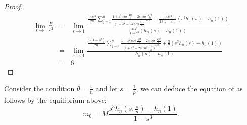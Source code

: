 \documentclass[11pt]{article}
\def\lb{\label}
\begin{document}
\begin{proof}
\begin{eqnarray*}
       \lim_{s\to }\frac{B}{\omega^2}&=& \lim_{s\to 1}
       \frac{
      \frac{3Ms^3}{2n}\sum_{j=1}^{n}
      \frac{
      1+s^2\cos{\frac{4j\pi}{n}}-2s\cos{\frac{2j\pi}{n}}
      }      {  (1+s^2-2s\cos{\frac{2j\pi}{n})} ^{5/2 } }
      +\frac{3Ms^3}{2(1-s^3)}(s^3h_n(s)-h_n(1))
      }
       {
       \frac{Ms^3}{1-s^3}(h_n(s)-h_n(1))
       }\\
       &=&\lim_{s\to 1}\frac{
       \frac{3(1-s^3)}{2n}\sum_{j=1}^{n}
      \frac{
      1+s^2\cos{\frac{4j\pi}{n}}-2s\cos{\frac{2j\pi}{n}}
      }      {  (1+s^2-2s\cos{\frac{2j\pi}{n})} ^{5/2 } }+\frac{3}{2}(s^3h_n(s)-h_n(1))
       }
       {h_n(s)-h_n(1)}\\
       &=&6
   \end{eqnarray*}
\end{proof}

Consider the condition $\theta=\frac{\pi}{n}$ and let $s=\frac{1}{\rho}$, we can deduce the equation of as follows by the equilibrium  above:
\begin{equation}\lb{S3}
m_0=M\frac{s^3h_n(s,\frac{\pi}{n})-h_n(1)}{1-s^3}.
\end{equation}
\end{document}
